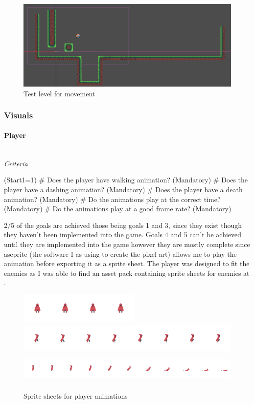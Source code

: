 \documentclass{article}
\newcommand{\parBr}{\vspace{5mm}}%
\newcommand{\myparagraph}[1]{\paragraph{#1}\mbox{}\\} %
\begin{document}
\begin{figure}[H]
\centering
\includegraphics[width = 0.5\linewidth]{test scene}
\caption{Test level for movement}
\label{move_test}
\end{figure}

\subsubsection{Visuals}
\myparagraph{Player}
\textit{Criteria}
\begin{easylist}
\ListProperties(Start1=1)
# Does the player have walking animation? (Mandatory)
# Does the player have a dashing animation? (Mandatory)
# Does the player have a death animation? (Mandatory)
# Do the animations play at the correct time? (Mandatory)
# Do the animations play at a good frame rate? (Mandatory) 
\end{easylist}

\parBr

2/5 of the goals are achieved those being goals 1 and 3, since they exist though they haven't been implemented into the game. Goals 4 and 5 can't be achieved until they are implemented into the game however they are mostly complete since aseprite (the software I as using to create the pixel art) allows me to play the animation before exporting it as a sprite sheet. The player was designed to fit the enemies as I was able to find an asset pack containing sprite sheets for enemies at \cite{pixel_art}.

\begin{figure}[H]
\centering
\includegraphics[height = 1.5cm]{player_idle}
\includegraphics[height = 1.5cm]{player_walk}
\includegraphics[height = 1.5cm]{player_death}
\caption{Sprite sheets for player animations}
\label{player_sprite}
\end{figure}
\end{document}
